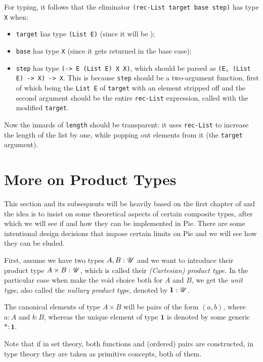 For typing, it follows that the eliminator \texttt{(rec-List target base step)}
has type \texttt{X} when:
\begin{itemize}
\item \texttt{target} has type \texttt{(List E)} (since it will be );
\item \texttt{base} has type \texttt{X} (since it gets returned in the base case);
\item \texttt{step} has type \texttt{(-> E (List E) X X)}, which should be
  parsed as \texttt{(E, (List E) -> X) -> X}. This is because \texttt{step} should
  be a two-argument function, first of which being the \texttt{List E} of \texttt{target}
  with an element stripped off and the second argument should be the entire
  \texttt{rec-List} expression, called with the modified \texttt{target}.
\end{itemize}

Now the innards of \texttt{length} should be transparent: it uses \texttt{rec-List}
to increase the length of the list by one, while popping out elements
from it (the \texttt{target} argument).

\section{More on Product Types}

This section and its subsequents will be heavily based on the first chapter of
\cite{hott} and the idea is to insist on some theoretical aspects of certain
composite types, after which we will see if and how they can be implemented
in Pie. There are some intentional design decisions that impose certain
limits on Pie and we will see how they can be eluded.

First, assume we have two types $ A, B : \mathscr{U} $ and we want to introduce
their product type $ A \times B : \mathscr{U} $, which is called their
\emph{(Cartesian) product type.} In the particular case when make the
void choice both for $ A $ and $ B $, we get the \emph{unit type},
also called the \emph{nullary product type}, denoted by $ \pmb{1} : \mathscr{U} $.

The canonical elements of type $ A \times B $ will be pairs of the form
$ (a, b) $, where $ a : A $ and $ b : B $, whereas the unique element of
type $ \pmb{1} $ is denoted by some generic $ \ast : \pmb{1} $.

Note that if in set theory, both functions and (ordered) pairs are constructed,
in type theory they are taken as primitive concepts, both of them.

